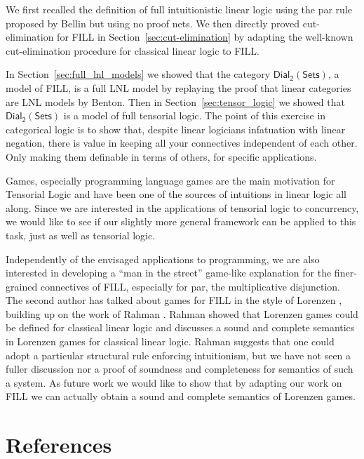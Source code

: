 \documentclass[preprint,6pt]{elsarticle}
\newcommand{\dial}[0]{\mathsf{Dial_2}(\mathsf{Sets})}
\begin{document}
We first recalled the definition of full intuitionistic linear logic using the  par rule proposed by Bellin 
but using
no proof nets.  We then directly proved cut-elimination for FILL in Section~\ref{sec:cut-elimination} by
adapting the well-known cut-elimination procedure for classical linear
logic to FILL.

In Section~\ref{sec:full_lnl_models} we showed that the category
$\dial$, a model of FILL, is a full LNL model by 
replaying the proof that linear
categories are LNL models by Benton. Then in
Section~\ref{sec:tensor_logic} we showed that $\dial$ is a model of full tensorial logic. The point of this exercise in categorical logic
is to show that, despite linear logicians infatuation with linear negation, there is value in keeping all your connectives independent
of each other. Only making them definable in terms of others, for
specific applications.

Games, especially programming language games are the main motivation
for Tensorial Logic and have been one of the sources of intuitions in
linear logic all along. Since we are interested in the applications of
tensorial logic to concurrency, we would like to see if our slightly
more general framework can be applied to this task, just as well as
tensorial logic.

Independently of the envisaged applications to programming, we are
also interested in developing a ``man in the street'' game-like
explanation for the finer-grained connectives of FILL, especially for
par, the multiplicative disjunction. The second author has talked
about games for FILL in the style of Lorenzen \cite{dePaiva:2011},
building up on the work of Rahman
\cite{Keiff:2011,Rahman:2005}. Rahman showed that Lorenzen games could
be defined for classical linear logic \cite{Rahman:2002} and discusses  a sound and complete semantics in Lorenzen games for
classical linear logic. Rahman suggests that one could adopt
a particular structural rule  enforcing intuitionism, but we have not
seen a fuller discussion nor a  proof of soundness and completeness for  semantics of such a system. As future work we would like to show that by adapting our work on FILL  we can actually
obtain a sound and complete semantics of Lorenzen games.


\section*{References}
\label{sec:references}


\end{document}
